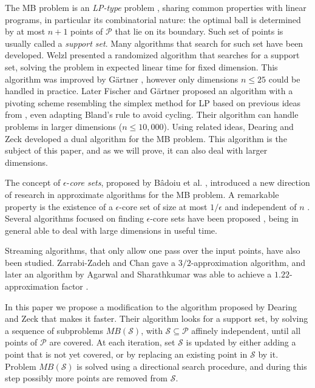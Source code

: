 The MB problem is an \emph{LP-type} problem \cite{Dyer04}, sharing common properties with linear programs, in particular its combinatorial nature: the optimal ball is determined by at most $n+1$ points of ${\mathcal{P}}$ that lie on its boundary. Such set of points is usually called a \emph{support set}. Many algorithms that search for such set have been developed. Welzl \cite{Welzl91} presented a randomized algorithm that searches for a support set, solving the problem in expected linear time for fixed dimension. This algorithm was improved by G\"artner \cite{Gartner99}, however only dimensions $n\leq 25$ could be handled in practice. Later Fischer and G{\"a}rtner \cite{Fischer04} proposed an algorithm with a pivoting scheme resembling the simplex method for LP based on previous ideas from \cite{Hopp96}, even adapting Bland's rule to avoid cycling. Their algorithm can handle problems in larger dimensions ($n\leq 10,000$). Using related ideas, Dearing and Zeck \cite{Dearing09} developed a dual algorithm for the MB problem. This algorithm is the subject of this paper, and as we will prove, it can also deal with larger dimensions.

The concept of $\epsilon$-\emph{core sets}, proposed by B\^{a}doiu et al. \cite{Badoiu02}, introduced a new direction of research in approximate algorithms for the MB problem. A remarkable property is the existence of a $\epsilon$-core set of size at most $1/\epsilon$ and independent of $n$ \cite{Badoiu03,Kumar03}. Several algorithms focused on finding $\epsilon$-core sets have been proposed \cite{Badoiu02,Badoiu03,Kumar03,Yildirim08,Nielsen09,Larsson13}, being in general able to deal with large dimensions in useful time.

Streaming algorithms, that only allow one pass over the input points, have also been studied. Zarrabi-Zadeh and Chan \cite{Zarrabi06} gave a $3/2$-approximation algorithm, and later an algorithm by Agarwal and Sharathkumar \cite{Agarwal15} was able to achieve a $1.22$-approximation factor \cite{Chan11}.

\medskip

In this paper we propose a modification to the algorithm proposed by Dearing and Zeck \cite{Dearing09} that makes it faster. Their algorithm looks for a support set, by solving a sequence of subproblems $MB({\mathcal{S}})$, with ${\mathcal{S}}\subseteq{\mathcal{P}}$ affinely independent, until all points of ${\mathcal{P}}$ are covered. At each iteration, set ${\mathcal{S}}$ is updated by either adding a point that is not yet covered, or by replacing an existing point in ${\mathcal{S}}$ by it. Problem $MB({\mathcal{S}})$ is solved using a directional search procedure, and during this step possibly more points are removed from ${\mathcal{S}}$. 

